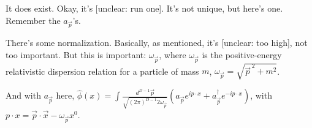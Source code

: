 
It does exist. Okay, it's [unclear: run one]. It's not unique, but here's one. Remember the \(a_{\vec p}\)'s.


There's some normalization. Basically, as mentioned, it's [unclear: too high], not too important. But this is important: \(\omega_{\vec p}\), where \(\omega_{\vec p}\) is the positive-energy relativistic dispersion relation for a particle of mass \(m\), \(\omega_{\vec p}=\sqrt{\vec p^{\,2}+m^2}\).


And with \(a_{\vec p}\) here, \(\widehat\phi(x)=\int \frac{d^{D-1}\vec p}{\sqrt{(2\pi)^{D-1}2\omega_{\vec p}}}\left(a_{\vec p}e^{ip\cdot x}+a_{\vec p}^{\dagger}e^{-ip\cdot x}\right)\), with \(p\cdot x=\vec p\cdot\vec x-\omega_{\vec p}x^0\).

